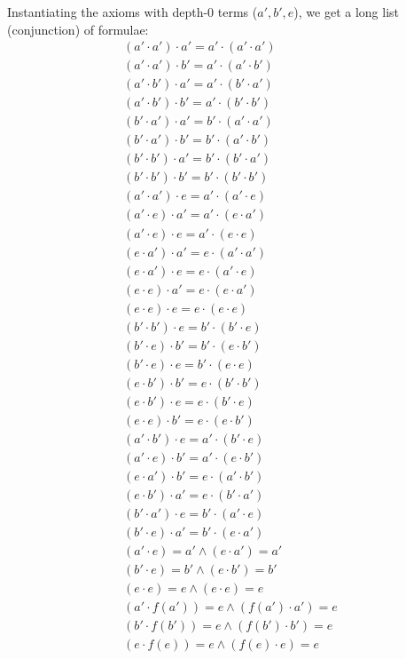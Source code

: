 \documentclass[12pt,letterpaper, onecolumn]{exam}
\begin{document}
\begin{questions}
	Instantiating the axioms with depth-0 terms ($a', b', e$), we get a long list (conjunction) of formulae:
	\begin{align*}
		(a' \cdot a') \cdot a' = a' \cdot (a' \cdot a') \\
		(a' \cdot a') \cdot b' = a' \cdot (a' \cdot b') \\
		(a' \cdot b') \cdot a' = a' \cdot (b' \cdot a') \\
		(a' \cdot b') \cdot b' = a' \cdot (b' \cdot b') \\
		(b' \cdot a') \cdot a' = b' \cdot (a' \cdot a') \\
		(b' \cdot a') \cdot b' = b' \cdot (a' \cdot b') \\
		(b' \cdot b') \cdot a' = b' \cdot (b' \cdot a') \\
		(b' \cdot b') \cdot b' = b' \cdot (b' \cdot b') \\ %
		(a' \cdot a') \cdot e = a' \cdot (a' \cdot e) \\
		(a' \cdot e) \cdot a' = a' \cdot (e \cdot a') \\
		(a' \cdot e) \cdot e = a' \cdot (e \cdot e) \\
		(e \cdot a') \cdot a' = e \cdot (a' \cdot a') \\
		(e \cdot a') \cdot e = e \cdot (a' \cdot e) \\
		(e \cdot e) \cdot a' = e \cdot (e \cdot a') \\
		(e \cdot e) \cdot e = e \cdot (e \cdot e) \\  %
		(b' \cdot b') \cdot e = b' \cdot (b' \cdot e) \\
		(b' \cdot e) \cdot b' = b' \cdot (e \cdot b') \\
		(b' \cdot e) \cdot e = b' \cdot (e \cdot e) \\
		(e \cdot b') \cdot b' = e \cdot (b' \cdot b') \\
		(e \cdot b') \cdot e = e \cdot (b' \cdot e) \\
		(e \cdot e) \cdot b' = e \cdot (e \cdot b') \\ %
		(a' \cdot b') \cdot e = a' \cdot (b' \cdot e) \\
		(a' \cdot e) \cdot b' = a' \cdot (e \cdot b') \\
		(e \cdot a') \cdot b' = e \cdot (a' \cdot b') \\
		(e \cdot b') \cdot a' = e \cdot (b' \cdot a') \\
		(b' \cdot a') \cdot e = b' \cdot (a' \cdot e) \\
		(b' \cdot e) \cdot a' = b' \cdot (e \cdot a') \\ %
		(a' \cdot e) = a' \land (e \cdot a') = a' \\
		(b' \cdot e) = b' \land (e \cdot b') = b' \\
		(e \cdot e) = e \land (e \cdot e) = e \\ %
		(a' \cdot f(a')) = e \land (f(a') \cdot a') = e \\
		(b' \cdot f(b')) = e \land (f(b') \cdot b') = e \\
		(e \cdot f(e)) = e \land (f(e) \cdot e) = e
	\end{align*}


\end{questions}
\end{document}
